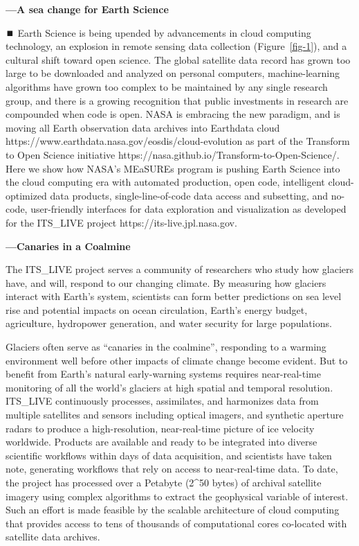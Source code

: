 \documentclass[
  super,
  preprint,
  3p,
  twocolumn]{elsarticle}
\begin{document}
\textbf{---A sea change for Earth Science}

⏹️ Earth Science is being upended by advancements in cloud computing
technology, an explosion in remote sensing data collection
(Figure~\ref{fig-1}), and a cultural shift toward open science. The
global satellite data record has grown too large to be downloaded and
analyzed on personal computers, machine-learning algorithms have grown
too complex to be maintained by any single research group, and there is
a growing recognition that public investments in research are compounded
when code is open. NASA is embracing the new paradigm, and is moving all
Earth observation data archives into Earthdata cloud
https://www.earthdata.nasa.gov/eosdis/cloud-evolution as part of the
Transform to Open Science initiative
https://nasa.github.io/Transform-to-Open-Science/. Here we show how
NASA's MEaSUREs program is pushing Earth Science into the cloud
computing era with automated production, open code, intelligent
cloud-optimized data products, single-line-of-code data access and
subsetting, and no-code, user-friendly interfaces for data exploration
and visualization as developed for the ITS\_LIVE project
https://its-live.jpl.nasa.gov.

\textbf{---Canaries in a Coalmine}

The ITS\_LIVE project serves a community of researchers who study how
glaciers have, and will, respond to our changing climate. By measuring
how glaciers interact with Earth's system, scientists can form better
predictions on sea level rise and potential impacts on ocean
circulation, Earth's energy budget, agriculture, hydropower generation,
and water security for large populations.

Glaciers often serve as ``canaries in the coalmine'', responding to a
warming environment well before other impacts of climate change become
evident. But to benefit from Earth's natural early-warning systems
requires near-real-time monitoring of all the world's glaciers at high
spatial and temporal resolution. ITS\_LIVE continuously processes,
assimilates, and harmonizes data from multiple satellites and sensors
including optical imagers, and synthetic aperture radars to produce a
high-resolution, near-real-time picture of ice velocity worldwide.
Products are available and ready to be integrated into diverse
scientific workflows within days of data acquisition, and scientists
have taken note, generating workflows that rely on access to
near-real-time data. To date, the project has processed over a Petabyte
(2\^{}50 bytes) of archival satellite imagery using complex algorithms
to extract the geophysical variable of interest. Such an effort is made
feasible by the scalable architecture of cloud computing that provides
access to tens of thousands of computational cores co-located with
satellite data archives.
\end{document}
